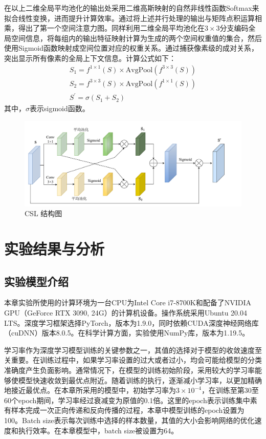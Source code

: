 在以上二维全局平均池化的输出处采用二维高斯映射的自然非线性函数Softmax来拟合线性变换，进而提升计算效率。通过将上述并行处理的输出与矩阵点积运算相乘，得出了第一个空间注意力图。同样利用二维全局平均池化在$3\times 3$分支编码全局空间信息，将每组内的输出特征映射计算为生成的两个空间权重值的集合，然后使用Sigmoid函数映射成空间位置对应的权重关系。通过捕获像素级的成对关系，突出显示所有像素的全局上下文信息。计算公式如下：
\begin{gather}
    S_1=f^{1\times 1}\left( S \right) \times \mathrm{AvgPool}\left( f^{3\times 3}\left( S \right) \right)
    \\
    S_2=f^{3\times 3}\left( S \right) \times \mathrm{AvgPool}\left( f^{1\times 1}\left( S \right) \right)
    \\
    S^{\prime}=\sigma \left( S_1+S_2 \right)
\end{gather}
其中，$\sigma$表示sigmoid函数。

\begin{figure}[ht!]
    \centering
    \includegraphics[width=14cm]{pic/chapter3/跨空间学习.pdf}
    \caption{CSL 结构图}
    \label{DPEN_CSL}
\end{figure}


\section{实验结果与分析}
\subsection{实验模型介绍}
本章实验所使用的计算环境为一台CPU为Intel Core i7-8700K和配备了NVIDIA GPU（GeForce RTX 3090, 24G）的计算机设备。操作系统采用Ubuntu 20.04 LTS。深度学习框架选择PyTorch，版本为1.9.0，同时依赖CUDA深度神经网络库（cuDNN）版本8.0.5。在科学计算方面，实验使用NumPy库，版本为1.19.5。

学习率作为深度学习模型训练的关键参数之一，其值的选择对于模型的收敛速度至关重要。在训练过程中，如果学习率设置的过大或者过小，均会可能给模型的分类准确度产生负面影响。通常情况下，在模型的训练初始阶段，采用较大的学习率能够使模型快速收敛到最优点附近。随着训练的执行，逐渐减小学习率，以更加精确地接近最优点。在本章所采用的模型中，初始学习率为$3\times 10^{-4}$，在训练至第30至60个epoch期间，学习率经过衰减变为原值的0.1倍。这里的epoch表示训练集中素有样本完成一次正向传递和反向传播的过程，本章中模型训练的epoch设置为100。Batch size表示每次训练中选择的样本数量，其值的大小会影响网络的优化速度和执行效率。在本章模型中，batch size被设置为64。

